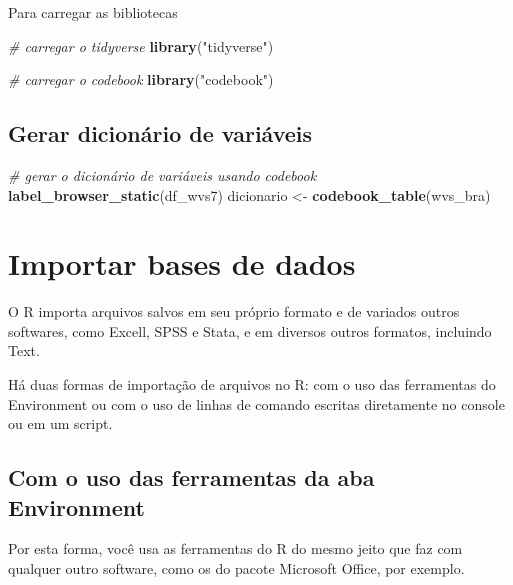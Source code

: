 \documentclass[
  brazil,
]{book}
\newenvironment{Shaded}{\begin{snugshade}}{\end{snugshade}}
\newcommand{\CommentTok}[1]{\textcolor[rgb]{0.56,0.35,0.01}{\textit{#1}}}
\newcommand{\KeywordTok}[1]{\textcolor[rgb]{0.13,0.29,0.53}{\textbf{#1}}}
\newcommand{\NormalTok}[1]{#1}
\newcommand{\StringTok}[1]{\textcolor[rgb]{0.31,0.60,0.02}{#1}}
\begin{document}
Para carregar as bibliotecas

\begin{Shaded}
\begin{Highlighting}[]
\CommentTok{# carregar o tidyverse}
\KeywordTok{library}\NormalTok{(}\StringTok{"tidyverse"}\NormalTok{)}

\CommentTok{# carregar o codebook}
\KeywordTok{library}\NormalTok{(}\StringTok{"codebook"}\NormalTok{)}
\end{Highlighting}
\end{Shaded}

\hypertarget{gerar-dicionuxe1rio-de-variuxe1veis}{%
\section{Gerar dicionário de variáveis}\label{gerar-dicionuxe1rio-de-variuxe1veis}}

\begin{Shaded}
\begin{Highlighting}[]
\CommentTok{# gerar o dicionário de variáveis usando codebook}
\KeywordTok{label_browser_static}\NormalTok{(df_wvs7)}
\NormalTok{dicionario <-}\StringTok{ }\KeywordTok{codebook_table}\NormalTok{(wvs_bra)}
\end{Highlighting}
\end{Shaded}

\hypertarget{importar-bases-de-dados}{%
\chapter{Importar bases de dados}\label{importar-bases-de-dados}}

O R importa arquivos salvos em seu próprio formato e de variados outros softwares, como Excell, SPSS e Stata, e em diversos outros formatos, incluindo Text.

Há duas formas de importação de arquivos no R: com o uso das ferramentas do Environment ou com o uso de linhas de comando escritas diretamente no console ou em um script.

\hypertarget{com-o-uso-das-ferramentas-da-aba-environment}{%
\section{Com o uso das ferramentas da aba Environment}\label{com-o-uso-das-ferramentas-da-aba-environment}}

Por esta forma, você usa as ferramentas do R do mesmo jeito que faz com qualquer outro software, como os do pacote Microsoft Office, por exemplo.
\end{document}
